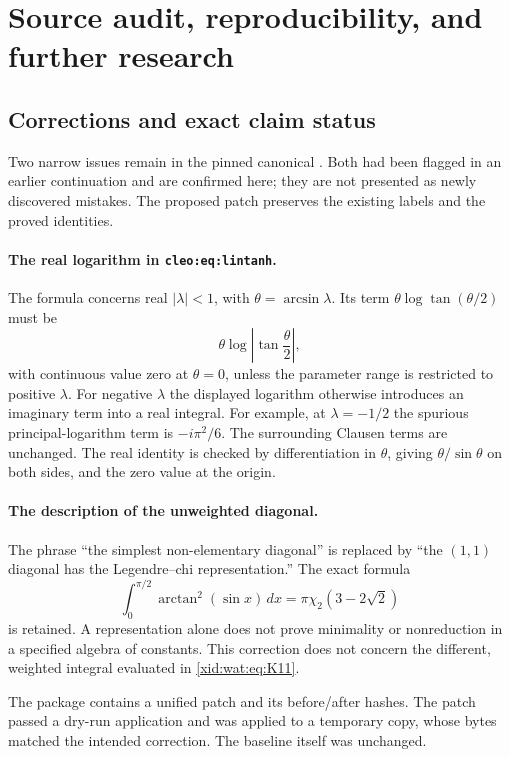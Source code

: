 \section{Source audit, reproducibility, and further research}
\label{xid:sec:audit}

\subsection{Corrections and exact claim status}

Two narrow issues remain in the pinned canonical
. Both had been flagged in an earlier
continuation and are confirmed here; they are not presented as newly
discovered mistakes. The proposed patch preserves the existing labels
and the proved identities.

\paragraph{The real logarithm in \texttt{cleo:eq:lintanh}.}
The formula concerns real $|\lambda|<1$, with
$\theta=\arcsin\lambda$. Its term
$\theta\log\tan(\theta/2)$ must be
\[
 \theta\log\left|\tan\frac\theta2\right|,
\]
with continuous value zero at $\theta=0$, unless the parameter range is
restricted to positive $\lambda$. For negative $\lambda$ the displayed
logarithm otherwise introduces an imaginary term into a real integral.
For example, at $\lambda=-1/2$ the spurious principal-logarithm term is
$-i\pi^2/6$. The surrounding Clausen terms are unchanged. The real
identity is checked by differentiation in $\theta$, giving
$\theta/\sin\theta$ on both sides, and the zero value at the origin.

\paragraph{The description of the unweighted diagonal.}
The phrase ``the simplest non-elementary diagonal'' is replaced by
``the $(1,1)$ diagonal has the Legendre--chi representation.'' The exact
formula
\[
 \int_0^{\pi/2}\arctan^2(\sin x)\,dx
       =\pi\chi_2(3-2\sqrt2)
\]
is retained. A representation alone does not prove minimality or
nonreduction in a specified algebra of constants. This correction does
not concern the different, weighted integral evaluated in
\eqref{xid:wat:eq:K11}.

\medskip
\noindent The package contains a unified patch and its before/after
hashes. The patch passed a dry-run application and was applied to a
temporary copy, whose bytes matched the intended correction. The
baseline itself was unchanged.

